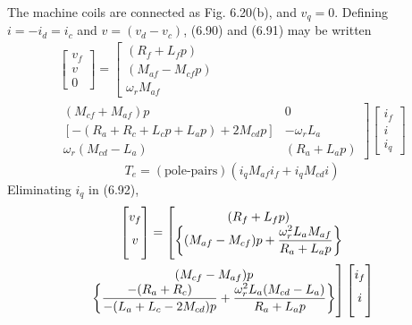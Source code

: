 \documentclass[a4paper,numbers=noenddot,12pt]{scrbook}
\begin{document}
The machine coils are connected as Fig. 6.20(b), and $v_q = 0$. Defining $i = -i_d = i_c$ and $v = (v_d - v_c)$, (6.90) and (6.91) may be written
\begin{multline}
    \begin{bmatrix}
        v_f \\ v \\ 0
    \end{bmatrix}
    =
    \left[
        \begin{matrix}
            (R_f + L_f p) \\
            (M_{af} - M_{cf} p) \\
            \omega_r M_{af}
        \end{matrix}
        \right.\\
        \left.
        \begin{matrix}
            (M_{cf} + M_{af}) p & 0 \\
            [-(R_a + R_c + L_c p + L_a p) + 2 M_{cd}p] & -\omega_r L_a \\
            \omega_r(M_{cd} - L_a) & (R_a + L_a p)
        \end{matrix}
    \right]
    \begin{bmatrix}
        i_f \\i \\i_q
    \end{bmatrix}
\end{multline}
\begin{equation}
    T_e = (\text{pole-pairs})(i_q M_{af} i_f + i_q M_{cd} i)
    \label{eq:Eq6.93}
\end{equation}
Eliminating $i_q$ in (6.92),
\begin{multline}
    \begin{bmatrix}
        v_f \\  v \vphantom{\bigg\{\dfrac{M^2}{R_a}\bigg\}} 
    \end{bmatrix}
    =
    \left[
        \begin{matrix}
            (R_f + L_f p) \\ 
            \bigg\{(M_{af} - M_{cf})p + \dfrac{\omega_r^2 L_a M_{af}}{R_a + L_a p}\bigg\}
        \end{matrix}
        \right . \\
        \left .
        \begin{matrix}
            (M_{cf} - M_{af})p \\
            \bigg\{\dfrac{-(R_a + R_c)}{-(L_a + L_c -2 M_{cd})p} + \dfrac{\omega_r^2 L_a (M_{cd} - L_a)}{R_a + L_a p}\bigg\}
        \end{matrix}
    \right]
    \begin{bmatrix}
        i_f \\ i \vphantom{\bigg\{\dfrac{M^2}{R_a}\bigg\}} 
    \end{bmatrix}
\end{multline}
\end{document}
